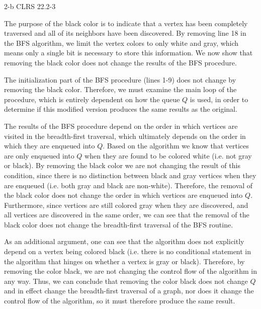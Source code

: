 \documentclass[11pt]{article}
\begin{document}
\begin{prob}{2-b}
CLRS 22.2-3 
\end{prob}
\begin{sol} 

The purpose of the black color is to indicate that a vertex has been completely traversed and all of its neighbors have been discovered. By removing line 18 in the BFS algorithm, we limit the vertex colors to only white and gray, which means only a single bit is necessary to store this information. We now show that removing the black color does not change the results of the BFS procedure. 

The initialization part of the BFS procedure (lines 1-9) does not change by removing the black color. Therefore, we must examine the main loop of the procedure, which is entirely dependent on how the queue $Q$ is used, in order to determine if this modified version produces the same results as the original. 

The results of the BFS procedure depend on the order in which vertices are visited in the breadth-first traversal, which ultimately depends on the order in which they are enqueued into $Q$. Based on the algorithm we know that vertices are only enqueued into $Q$ when they are found to be colored white (i.e. not gray or black). By removing the black color we are not changing the result of this condition, since there is no distinction between black and gray vertices when they are enqueued (i.e. both gray and black are non-white). Therefore, the removal of the black color does not change the order in which vertices are enqueued into $Q$. Furthermore, since vertices are still colored gray when they are discovered, and all vertices are discovered in the same order, we can see that the removal of the black color does not change the breadth-first traversal of the BFS routine.

As an additional argument, one can see that the algorithm does not explicitly depend on a vertex being colored black (i.e. there is no conditional statement in the algorithm that hinges on whether a vertex is gray or black). Therefore, by removing the color black, we are not changing the control flow of the algorithm in any way. Thus, we can conclude that removing the color black does not change $Q$ and in effect change the breadth-first traversal of a graph, nor does it change the control flow of the algorithm, so it must therefore produce the same result.

\begin{comment}
Let $v$ be a vertex in that was just added to $Q$ for the first time. If at a later point in time (after $v$ was added to $Q$) $v$ is re-added to $Q$, we now have the sequence $v, v_{1}, v_{2}, ..., v_{i}, v$ contained in $Q$. Based on the iterative approach to the BFS procedure, all of the vertices $v, v_{1}, v_{2}, ..., v_{i}$ will be colored black by the time the second instance of $v$ is dequeued from $Q$ to be processed. This has two implications:


\end{comment}
\end{sol}
\end{document}
